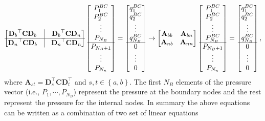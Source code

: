 \documentclass[%
reprint,
 amsmath,amssymb,
 aps,
prl,
]{revtex4-1}
\begin{document}
\begin{align}
 \begin{bmatrix} {\mathbf{D}_{b}}^\top \mathbf{C} {\mathbf{D}_{b}}  & \vline &    {\mathbf{D}_{b}}^\top \mathbf{C} {\mathbf{D}_{n}}\\ \hline   
    {\mathbf{D}_{n}}^\top \mathbf{C} {\mathbf{D}_{b}} & \vline & {\mathbf{D}_{n}}^\top \mathbf{C} {\mathbf{D}_{n}}
    \end{bmatrix} \begin{bmatrix} P^{BC}_1 \\ P^{BC}_2 \\ \vdots \\ P_{N_B} \\  \hline  P_{N_B+1} \\ \vdots \\ P_{N_n}
    \end{bmatrix} = \begin{bmatrix} q^{BC}_1 \\ q^{BC}_2 \\ \vdots \\ q^{BC}_{N_B} \\ \hline  0 \\ \vdots \\ 0\end{bmatrix} \to 
    \begin{bmatrix} 
    \mathbf{A}_{bb} & \mathbf{A}_{bn} \\
    \mathbf{A}_{nb} & \mathbf{A}_{nn}       
    \end{bmatrix} \begin{bmatrix} P^{BC}_1 \\ P^{BC}_2 \\ \vdots \\ P^{BC}_{N_B} \\ \hline  P_{N_B+1} \\ \vdots \\ P_{N_n}
    \end{bmatrix} = \begin{bmatrix} q^{BC}_1 \\ q^{BC}_2 \\ \vdots \\ q^{BC}_{N_B}  \\ \hline  0 \\ \vdots \\ 0\end{bmatrix}, 
\end{align}
%
where $\mathbf{A}_{st} = \mathbf{D}^\top_s \mathbf{C}\mathbf{D}^\top_t$ and  $s,t\in\left\{a,b\right\}$. The first $N_B$ elements of the pressure vector (i.e., $P_1, \cdots, P_{N_B}$) represent the pressure at the boundary nodes and the rest represent the pressure for the internal nodes. In summary the above equations can be written as a combination of two set of linear equations 
\end{document}
